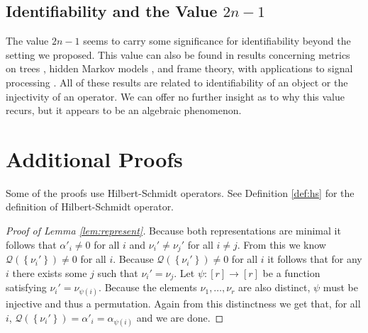 \documentclass[aos,preprint]{imsart}
\def\l{\left}
\def\r{\right}
\def\sQ{\mathscr{Q}}
\theoremstyle{plain}
\theoremstyle{defintion}
\begin{document}
	\subsection{Identifiability and the Value $2n-1$}
	The value $2n-1$ seems to carry some significance for identifiability beyond the setting we proposed. This value can also be found in results concerning metrics on trees \cite{pachter04}, hidden Markov models \cite{paz71}, and frame theory, with applications to signal processing \cite{balan06}. All of these results are related to identifiability of an object or the injectivity of an operator. We can offer no further insight as to why this value recurs, but it appears to be an algebraic phenomenon.

	\appendix 
	\section{Additional Proofs} \label{appx:proofs}
	Some of the proofs use Hilbert-Schmidt operators. See Definition \ref{def:hs} for the definition of Hilbert-Schmidt operator.
	\begin{proof}[Proof of Lemma \ref{lem:represent}]
		Because both representations are minimal it follows that $\alpha'_i \neq 0$ for all $i$ and $\nu_i' \neq \nu_j'$ for all $i \neq j$. From this we know $\sQ\left( \l\{\nu_i'\r\} \right) \neq 0$ for all $i$. Because $\sQ\left( \l\{\nu_i'\r\} \right) \neq 0$ for all $i$ it follows that for any $i$ there exists some $j$ such that $\nu_i' = \nu_j$. Let $\psi: \left[ r \right] \to \left[ r \right]$ be a function satisfying $\nu_i' = \nu_{\psi\left( i \right)}$. Because the elements $\nu_1,\ldots,\nu_r$ are also distinct, $\psi$ must be injective and thus a permutation. Again from this distinctness we get that, for all $i$, $\sQ\left( \left\{ \nu_i' \right\}  \right)= \alpha'_i =\alpha_{\psi\left( i \right)}$ and we are done.
	\end{proof}
\end{document}
